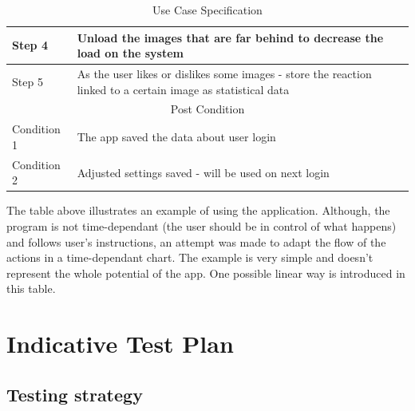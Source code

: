 \documentclass[12pt]{report}
\begin{document}
\begin{table}[h]
{\begin{tabular}{|lllll|}
                \multicolumn{1}{|l|}{Step 4}         & \multicolumn{4}{l|}{Unload the images that are far behind to decrease the load on the system}                                           \\ \hline
                \multicolumn{1}{|l|}{Step 5}         & \multicolumn{4}{l|}{As the user likes or dislikes some images - store the reaction linked to a certain image as statistical data}       \\ \hline
                \multicolumn{5}{|c|}{Post Condition}                                                                                                                                           \\ \hline
                \multicolumn{1}{|l|}{Condition 1}    & \multicolumn{4}{l|}{The app saved the data about user login}                                                                            \\ \hline
                \multicolumn{1}{|l|}{Condition 2}    & \multicolumn{4}{l|}{Adjusted settings saved - will be used on next login}                                                               \\ \hline
            \end{tabular}%
        }
        \caption{Use Case Specification}
    \end{table}

    The table above illustrates an example of using the application. Although, the program is not time-dependant (the user should be in control of what happens) and follows user's instructions, an attempt was made to adapt the flow of the actions in a time-dependant chart.
    The example is very simple and doesn't represent the whole potential of the app. One possible linear way is introduced in this table.

    \section*{Indicative Test Plan}
    
    \subsection*{Testing strategy}
\end{document}
